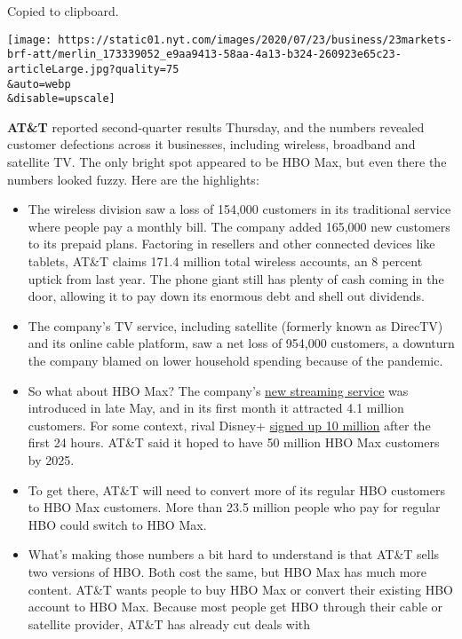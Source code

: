 Copied to clipboard.

\texttt{[image: https://static01.nyt.com/images/2020/07/23/business/23markets-brf-att/merlin\_173339052\_e9aa9413-58aa-4a13-b324-260923e65c23-articleLarge.jpg?quality=75\\\&auto=webp\\\&disable=upscale]}

\textbf{AT\&T} reported second-quarter results Thursday, and the numbers
revealed customer defections across it businesses, including wireless,
broadband and satellite TV. The only bright spot appeared to be HBO Max,
but even there the numbers looked fuzzy. Here are the highlights:

\begin{itemize}
\item
  The wireless division saw a loss of 154,000 customers in its
  traditional service where people pay a monthly bill. The company added
  165,000 new customers to its prepaid plans. Factoring in resellers and
  other connected devices like tablets, AT\&T claims 171.4 million total
  wireless accounts, an 8 percent uptick from last year. The phone giant
  still has plenty of cash coming in the door, allowing it to pay down
  its enormous debt and shell out dividends.
\item
  The company's TV service, including satellite (formerly known as
  DirecTV) and its online cable platform, saw a net loss of 954,000
  customers, a downturn the company blamed on lower household spending
  because of the pandemic.
\item
  So what about HBO Max? The company's
  \href{https://www.nytimes.com/2020/05/26/business/media/hbo-max-netflix-streaming.html}{new
  streaming service} was introduced in late May, and in its first month
  it attracted 4.1 million customers. For some context, rival Disney+
  \href{https://twitter.com/edmundlee/status/1194661580539125762}{signed
  up 10 million} after the first 24 hours. AT\&T said it hoped to have
  50 million HBO Max customers by 2025.
\item
  To get there, AT\&T will need to convert more of its regular HBO
  customers to HBO Max customers. More than 23.5 million people who pay
  for regular HBO could switch to HBO Max.
\item
  What's making those numbers a bit hard to understand is that AT\&T
  sells two versions of HBO. Both cost the same, but HBO Max has much
  more content. AT\&T wants people to buy HBO Max or convert their
  existing HBO account to HBO Max. Because most people get HBO through
  their cable or satellite provider, AT\&T has already cut deals with

\end{itemize}
